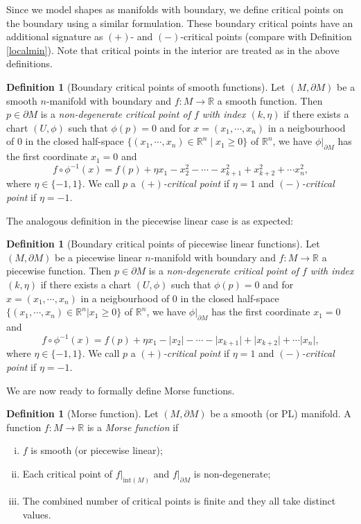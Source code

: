 \documentclass[a4paper,11pt]{article}
\theoremstyle{definition}
\newtheorem{defn}[theorem]{Definition}  \newtheorem{ex}[theorem]{Example}  \newtheorem{exs}[theorem]{Examples}  \newtheorem{question}[theorem]{Question}
\newcommand{\R}{\mathbb{R}}
\begin{document}
Since we model shapes as manifolds with boundary, we define critical points on the boundary using a similar formulation. These boundary critical points have an additional signature as  $(+)$- and $(-)$-critical points (compare with Definition \ref{localmin}). 
Note that critical points in the interior are treated as in the above definitions.  
 
\begin{defn}[Boundary critical points of smooth functions]
Let $(M,\partial M)$ be a smooth $n$-manifold with boundary and $f: M\to \R$ a smooth function. 
Then $p\in \partial M$ is a \emph{non-degenerate critical point of $f$ with index $(k,\eta)$} if there exists a chart $(U,\phi)$ such that $\phi(p) = 0$ and for $x= (x_1,\cdots,x_n)$ in a neigbourhood of $0$ in the closed half-space $\{(x_1,\cdots,x_n)\in\R^n\mid x_1\geq 0\}$ of $\R^n$, we have $\phi\vert_{\partial M}$ has the first coordinate $x_1=0$ and
$$f\circ \phi^{-1}(x) = f(p)+\eta x_1 - x_2^2-\cdots-x_{k+1}^2+x_{k+2}^2+\cdots x_n^2,$$ where $\eta\in \{-1,1\}$. We call $p$ a \emph{$(+)$-critical point} if $\eta=1$ and \emph{$(-)$-critical point} if $\eta=-1$.
\end{defn}

The analogous definition in the piecewise linear case is as expected: 
\begin{defn}[Boundary critical points of piecewise linear functions]
Let $(M,\partial M)$ be a piecewise linear $n$-manifold with boundary and $f: M\to \R$ a piecewise function. Then $p\in \partial M$ is a \emph{non-degenerate critical point of $f$ with index $(k,\eta)$} if there exists a chart $(U,\phi)$ such that $\phi(p) = 0$ and for $x= (x_1,\cdots,x_n)$ in a neigbourhood of $0$ in the closed half-space $\{(x_1,\cdots,x_n)\in\R^n\vert x_1\geq 0\}$ of $\R^n$, we have
$\phi\vert_{\partial M}$ has the first coordinate $x_1=0$ and 
$$f\circ \phi^{-1}(x) = f(p)+\eta x_1 - \lvert x_2\rvert-\cdots- \lvert x_{k+1}\rvert+ \lvert x_{k+2}\rvert+\cdots  \lvert x_n\rvert,$$ where $\eta\in \{-1,1\}$. We call $p$ a \emph{$(+)$-critical point} if $\eta=1$ and \emph{$(-)$-critical point} if $\eta=-1$. 
\end{defn}

We are now ready to formally define Morse functions. 

\begin{defn}[Morse function]
Let $(M, \partial M)$ be a smooth (or PL) manifold. A function $f: M\to\R$ is a \emph{Morse function} if
\begin{enumerate}[(i)]
\item $f$ is smooth (or piecewise linear);
\item Each critical point of $f\vert_{\text{int}(M)}$ and $f\vert_{\partial M}$ is non-degenerate;
\item The combined number of critical points is finite and they all take distinct values.
\end{enumerate}
\end{defn}
\end{document}
